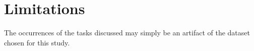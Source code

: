 \documentclass{sig-alternate-05-2015}
\begin{document}
\section{Limitations}
The occurrences of the tasks discussed may simply be an artifact of the dataset chosen for this study. 
\end{document}
